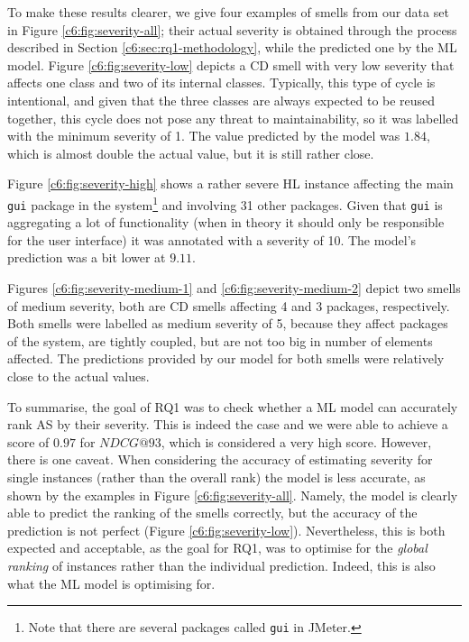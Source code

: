 To make these results clearer, we give four examples of smells from our data set in Figure \ref{c6:fig:severity-all}; their actual severity is obtained through the process described in Section \ref{c6:sec:rq1-methodology}, while the predicted one by the ML model.
Figure \ref{c6:fig:severity-low} depicts a CD smell with very low severity that affects one class and two of its internal classes.
Typically, this type of cycle is intentional, and given that the three classes are always expected to be reused together, this cycle does not pose any threat to maintainability, so it was labelled with the minimum severity of 1. 
The value predicted by the model was $1.84$, which is almost double the actual value, but it is still rather close.

Figure \ref{c6:fig:severity-high} shows a rather severe HL instance affecting the main \texttt{gui} package in the system\footnote{Note that there are several packages called \texttt{gui} in JMeter.} and involving 31 other packages.
Given that \texttt{gui} is aggregating a lot of functionality (when in theory it should only be responsible for the user interface) it was annotated with a severity of 10. 
The model's prediction was a bit lower at $9.11$.

Figures \ref{c6:fig:severity-medium-1} and \ref{c6:fig:severity-medium-2} depict two smells of medium severity, both are CD smells affecting 4 and 3 packages, respectively.
Both smells were labelled as medium severity of 5, because they affect packages of the system, are tightly coupled, but are not too big in number of elements affected.
The predictions provided by our model for both smells were relatively close to the actual values.

To summarise, the goal of RQ1 was to check whether a ML model can accurately rank AS by their severity. 
This is indeed the case and we were able to achieve a score of $0.97$ for $NDCG@93$, which is considered a very high score. However, there is one caveat. 
When considering the accuracy of estimating severity for  single instances  (rather than the overall rank) the model is less accurate, as shown by the examples in Figure \ref{c6:fig:severity-all}.
Namely, the model is clearly able to predict the ranking of the smells correctly, but the accuracy of the prediction is not perfect (Figure \ref*{c6:fig:severity-low}).
Nevertheless, this is both expected and acceptable, as the goal for RQ1, was to optimise for the \emph{global ranking} of instances rather than the individual prediction. Indeed, this is also what the ML model is optimising for.


